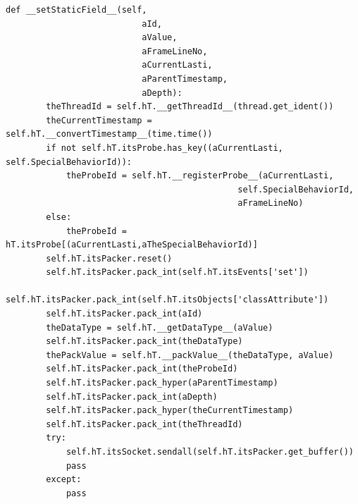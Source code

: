 \documentclass[12pt,legalpaper]{report}
\begin{document}
\begin{singlespace}
\begin{lstlisting}[style=Python]
    def __setStaticField__(self,
                           aId,
                           aValue,
                           aFrameLineNo,
                           aCurrentLasti,
                           aParentTimestamp,
                           aDepth):
        theThreadId = self.hT.__getThreadId__(thread.get_ident())
        theCurrentTimestamp = self.hT.__convertTimestamp__(time.time())
        if not self.hT.itsProbe.has_key((aCurrentLasti, self.SpecialBehaviorId)):
            theProbeId = self.hT.__registerProbe__(aCurrentLasti,
                                              self.SpecialBehaviorId,
                                              aFrameLineNo)
        else:
            theProbeId = hT.itsProbe[(aCurrentLasti,aTheSpecialBehaviorId)]
        self.hT.itsPacker.reset()
        self.hT.itsPacker.pack_int(self.hT.itsEvents['set'])
        self.hT.itsPacker.pack_int(self.hT.itsObjects['classAttribute'])
        self.hT.itsPacker.pack_int(aId)
        theDataType = self.hT.__getDataType__(aValue)
        self.hT.itsPacker.pack_int(theDataType)
        thePackValue = self.hT.__packValue__(theDataType, aValue)
        self.hT.itsPacker.pack_int(theProbeId)
        self.hT.itsPacker.pack_hyper(aParentTimestamp)        
        self.hT.itsPacker.pack_int(aDepth)
        self.hT.itsPacker.pack_hyper(theCurrentTimestamp)
        self.hT.itsPacker.pack_int(theThreadId)
        try:
            self.hT.itsSocket.sendall(self.hT.itsPacker.get_buffer())
            pass
        except:
            pass  
    

\end{lstlisting}
\end{singlespace}
\end{document}
